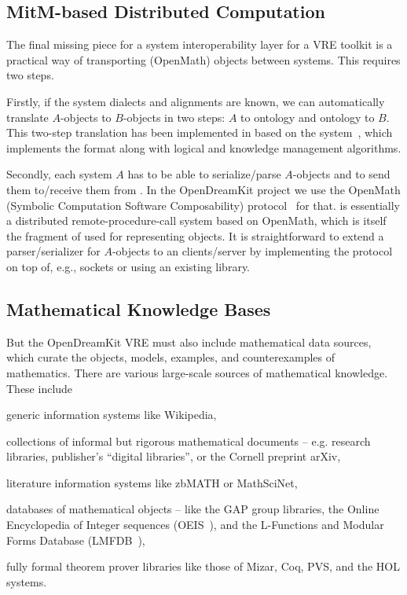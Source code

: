 \subsection{MitM-based Distributed Computation}\label{sec:mitm:comms}

The final missing piece for a system interoperability layer for a VRE toolkit is a practical way of transporting (OpenMath) objects between systems.
This requires two steps.

Firstly, if the system dialects and alignments are known, we can automatically translate $A$-objects to $B$-objects in two steps: $A$ to ontology and ontology to $B$.
This two-step translation has been implemented in \cite{MueRoYuRa:abtafs17} based on the \MMT system~\cite{Rabe:MAGMS13,uniformal:on}, which implements the \OMMT format along with logical and knowledge management algorithms.

Secondly, each system $A$ has to be able to serialize/parse $A$-objects and to send them to/receive them from \MMT.
In the OpenDreamKit project we use the OpenMath \SCSCP (Symbolic Computation Software Composability) protocol~\cite{SCSCP-1.3} for that. 
\SCSCP is essentially a distributed remote-procedure-call system based on OpenMath, which is itself the fragment of \OMMT used for representing objects.
It is straightforward to extend a parser/serializer for $A$-objects to an \SCSCP clients/server by implementing the \SCSCP protocol on top of, e.g., sockets or using an existing \SCSCP library. 


\subsection{Mathematical Knowledge Bases}\label{sec:mkb}

But the \textsf{OpenDreamKit} VRE must also include mathematical data sources, which
curate the objects, models, examples, and counterexamples of mathematics.  There are
various large-scale sources of mathematical knowledge.  These include
\begin{compactitem}
\item generic information systems like Wikipedia,
\item collections of informal but rigorous mathematical documents -- e.g. research libraries, publisher's ``digital libraries'', or the Cornell preprint arXiv,
\item literature information systems like zbMATH or MathSciNet,
\item databases of mathematical objects -- like the GAP group libraries, the Online Encyclopedia of Integer sequences (OEIS~\cite{Sloane:OEIS,oeis}), and the L-Functions and Modular Forms Database (LMFDB~\cite{Cremona:LMFDB16,lmfdb:on}),
\item fully formal theorem prover libraries like those of Mizar, Coq, PVS, and the HOL systems.
\end{compactitem}
  
